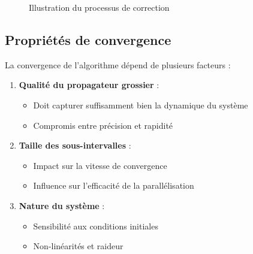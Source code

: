 \begin{figure}[h]
    \centering
    \caption{Illustration du processus de correction}
    \label{fig:correction}
\end{figure}

\subsection{Propriétés de convergence}
La convergence de l'algorithme dépend de plusieurs facteurs :

\begin{enumerate}
    \item \textbf{Qualité du propagateur grossier} :
    \begin{itemize}
        \item Doit capturer suffisamment bien la dynamique du système
        \item Compromis entre précision et rapidité
    \end{itemize}
    
    \item \textbf{Taille des sous-intervalles} :
    \begin{itemize}
        \item Impact sur la vitesse de convergence
        \item Influence sur l'efficacité de la parallélisation
    \end{itemize}
    
    \item \textbf{Nature du système} :
    \begin{itemize}
        \item Sensibilité aux conditions initiales
        \item Non-linéarités et raideur
    \end{itemize}
\end{enumerate}

